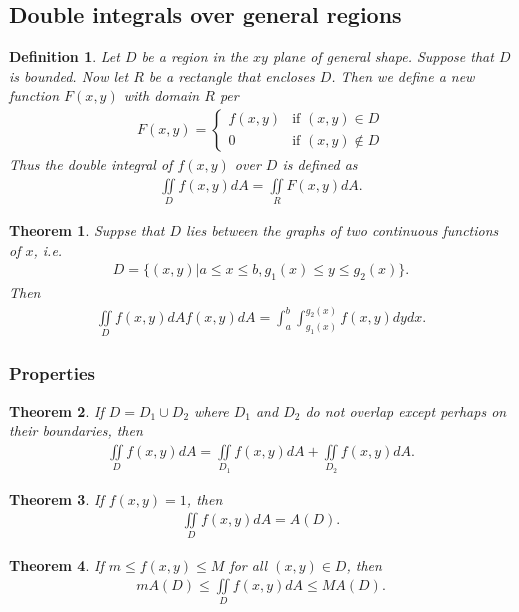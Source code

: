 \documentclass{article}
\theoremstyle{sltheorem}
\newtheorem{definition}{Definition}[section]
\newtheorem{theorem}{Theorem}[section]
\newcommand{\di}{\iint\limits}
\begin{document}
\subsection{Double integrals over general regions}
\begin{definition}
    Let $D$ be a region in the $xy$ plane of general shape.
    Suppose that $D$ is bounded. Now let $R$ be a rectangle that
    encloses $D$. Then we define a new function $F(x,y)$
    with domain $R$ per
    \begin{align*}
        F(x,y)=\begin{cases}
            f(x,y) &\text{if } (x,y)\in D\\
            0      &\text{if } (x,y)\not\in D
        \end{cases}
    \end{align*}
    Thus the double integral of $f(x,y)$ over $D$ is defined as
    \begin{align*}
        \di_D f(x,y)dA = \di_R F(x,y)dA.
    \end{align*}
\end{definition}
\begin{theorem}
    Suppse that $D$ lies between the graphs of two continuous
    functions of $x$, i.e.
    \begin{align*}
        D = \{(x,y) | a \leq x \leq b, g_1(x)\leq y\leq g_2(x)\}.
    \end{align*}
    Then
    \begin{align*}
        \di_D f(x,y)dA f(x,y)dA = \int_a^ b \int_{g_1(x)}^{g_2(x)} f(x,y)dy dx.
    \end{align*}
\end{theorem}
\subsubsection{Properties}
\begin{theorem}
    If $D=D_1\cup D_2$ where $D_1$ and $D_2$ do not overlap
    except perhaps on their boundaries, then
    \begin{align*}
        \di_D f(x,y) dA = \di_{D_1} f(x,y)dA + \di_{D_2}f(x,y)dA.
    \end{align*}
\end{theorem}
\begin{theorem}
    If $f(x,y)=1$, then 
    \begin{align*}
        \di_D f(x,y)dA = A(D).
    \end{align*}
\end{theorem}
\begin{theorem}
    If $m\leq f(x,y) \leq M$ for all $(x,y)\in D$, then
    \begin{align*}
        mA(D) \leq \di_D f(x,y) dA \leq MA(D).
    \end{align*}
\end{theorem}
\end{document}
